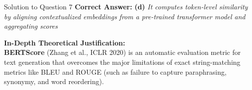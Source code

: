 \documentclass[11pt,a4paper]{article}
\begin{document}
\begin{solutionbox}{Solution to Question 7}
\textbf{Correct Answer:} \textbf{(d)} \textit{It computes token-level similarity by aligning contextualized embeddings from a pre-trained transformer model and aggregating scores}

\medskip
\textbf{In-Depth Theoretical Justification:}\\
\textbf{BERTScore} (Zhang et al., ICLR 2020) is an automatic evaluation metric for text generation that overcomes the major limitations of exact string-matching metrics like BLEU and ROUGE (such as failure to capture paraphrasing, synonymy, and word reordering).


\end{solutionbox}
\end{document}
